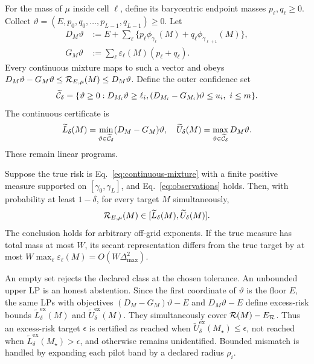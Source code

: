 For the mass of $\mu$ inside cell $\ell$, define its barycentric endpoint masses $p_\ell,q_\ell\ge0$. Collect
$\vartheta=(E,p_0,q_0,\ldots,p_{L-1},q_{L-1})\ge0$. Let
\begin{align}
 D_M\vartheta&:=E+\sum_\ell\{p_\ell\phi_{\gamma_\ell}(M)
 +q_\ell\phi_{\gamma_{\ell+1}}(M)\},\\
 G_M\vartheta&:=\sum_\ell\varepsilon_\ell(M)(p_\ell+q_\ell).
 \label{eq:DG}
\end{align}
Every continuous mixture maps to such a vector and obeys
$D_M\vartheta-G_M\vartheta\le\mathcal{R}_{E,\mu}(M)\le D_M\vartheta$.
Define the outer confidence set
\begin{equation}
 \widetilde{\mathcal{C}}_\delta=
 \{\vartheta\ge0:D_{M_i}\vartheta\ge\ell_i,
 (D_{M_i}-G_{M_i})\vartheta\le u_i,\ i\le m\}.
 \label{eq:continuous-set}
\end{equation}
The continuous certificate is
\begin{equation}
 \widetilde L_\delta(M)=\min_{\vartheta\in\widetilde{\mathcal{C}}_\delta}
 (D_M-G_M)\vartheta,
 \quad
 \widetilde U_\delta(M)=\max_{\vartheta\in\widetilde{\mathcal{C}}_\delta}D_M\vartheta.
 \label{eq:continuous-lp}
\end{equation}
These remain linear programs.

\begin{theorem}
\label{thm:continuous-certificate}
Suppose the true risk is Eq.~\eqref{eq:continuous-mixture} with a finite positive measure supported on
$[\gamma_0,\gamma_L]$, and Eq.~\eqref{eq:observations} holds. Then, with probability at least $1-\delta$, for every target $M$ simultaneously,
\begin{equation}
 \mathcal{R}_{E,\mu}(M)\in
 [\widetilde L_\delta(M),\widetilde U_\delta(M)].
 \label{eq:continuous-coverage}
\end{equation}
The conclusion holds for arbitrary off-grid exponents. If the true measure has total mass at most $W$, its secant representation differs from the true target by at most
$W\max_\ell\varepsilon_\ell(M)=O(W\Delta_{\max}^2)$.
\end{theorem}

An empty set rejects the declared class at the chosen tolerance. An unbounded upper LP is an honest abstention. Since the first coordinate of $\vartheta$ is the floor $E$, the same LPs with objectives $(D_M-G_M)\vartheta-E$ and $D_M\vartheta-E$ define excess-risk bounds $\widetilde L^{\mathrm{ex}}_\delta(M)$ and $\widetilde U^{\mathrm{ex}}_\delta(M)$. They simultaneously cover $\mathcal{R}(M)-E_{\mathcal{R}}$. Thus an excess-risk target $\epsilon$ is certified as reached when $\widetilde U^{\mathrm{ex}}_\delta(M_\star)\le\epsilon$, not reached when $\widetilde L^{\mathrm{ex}}_\delta(M_\star)>\epsilon$, and otherwise remains unidentified. Bounded mismatch is handled by expanding each pilot band by a declared radius $\rho_i$.

